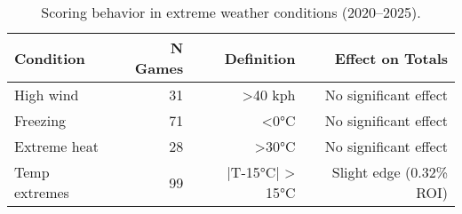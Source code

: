 \begin{table}[t]
  \centering
  \small
  \caption[Extreme weather conditions]{Scoring behavior in extreme weather conditions (2020--2025).}
  \label{tab:extreme-weather}
  \setlength{\tabcolsep}{4pt}\renewcommand{\arraystretch}{1.12}
  \begin{tabular}{@{} l r r r @{} }
    \toprule
    \textbf{Condition}  & \textbf{N Games}  & \textbf{Definition}  & \textbf{Effect on Totals} \\
    \midrule
    High wind & 31 & >40 kph & No significant effect \\
    Freezing & 71 & <0°C & No significant effect \\
    Extreme heat & 28 & >30°C & No significant effect \\
    Temp extremes & 99 & |T-15°C| > 15°C & Slight edge (0.32\% ROI) \\
    \bottomrule
  \end{tabular}
\end{table}
